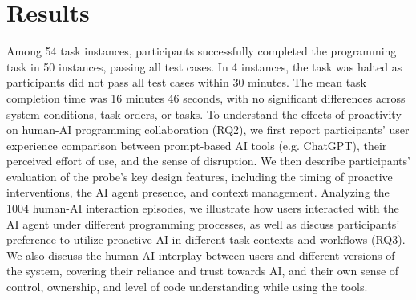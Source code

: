 \section{Results}
Among 54 task instances, participants successfully completed the programming task in 50 instances, passing all test cases. 
In 4 instances, the task was halted as participants did not pass all test cases within 30 minutes.
The mean task completion time was 16 minutes 46 seconds, with no significant differences across system conditions, task orders, or tasks.
To understand the effects of proactivity on human-AI programming collaboration (RQ2), we first report participants' user experience comparison between prompt-based AI tools (e.g. ChatGPT), their perceived effort of use, and the sense of disruption.
We then describe participants' evaluation of the \sys{} probe's key design features, including the timing of proactive interventions, the AI agent presence, and context management.
Analyzing the 1004 human-AI interaction episodes, we illustrate how users interacted with the AI agent under different programming processes, as well as discuss participants' preference to utilize proactive AI in different task contexts and workflows (RQ3).
We also discuss the human-AI interplay between users and different versions of the system, covering their reliance and trust towards AI, and their own sense of control, ownership, and level of code understanding while using the tools.




